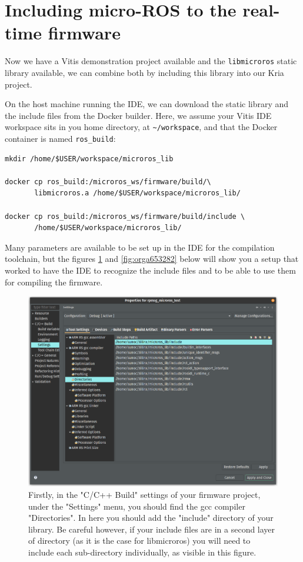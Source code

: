 \documentclass[10pt]{article}
\begin{document}
\section{Including micro-ROS to the real-time firmware}
\label{sec:org2e39386}
Now we have a Vitis demonstration project available and the \texttt{libmicroros} static library
available, we can combine both by including this library into our Kria project.

On the host machine running the IDE, we can download the static library
and the include files from the Docker builder.
Here, we assume your Vitis IDE workspace sits in you home directory, at \texttt{\textasciitilde{}/workspace},
and that the Docker container is named \texttt{ros\_build}:
\begin{verbatim}
mkdir /home/$USER/workspace/microros_lib

docker cp ros_build:/microros_ws/firmware/build/\
       libmicroros.a /home/$USER/workspace/microros_lib/

docker cp ros_build:/microros_ws/firmware/build/include \
       /home/$USER/workspace/microros_lib/
\end{verbatim}

Many parameters are available to be set up in the IDE for the compilation toolchain, but
the figures \ref{fig:org2b156b5} and \ref{fig:orga653282} below will show you a setup that worked to have the IDE
to recognize the include files and to be able to use them for compiling the firmware.

\begin{figure}[htbp]
\centering
\includegraphics[width=.6\textwidth]{./img/vitis_new/include.png}
\caption{\label{fig:org2b156b5}Firstly, in the "C/C++ Build" settings of your firmware project, under the "Settings" menu, you should find the gcc compiler "Directories". In here you should add the "include" directory of your library. Be careful however, if your include files are in a second layer of directory (as it is the case for libmicroros) you will need to include each sub-directory individually, as visible in this figure.}
\end{figure}
\end{document}
